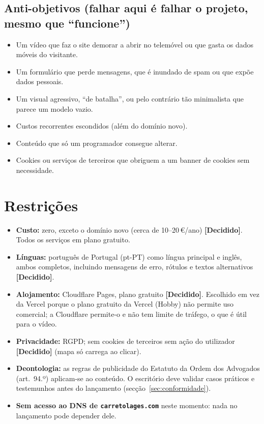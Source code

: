 \documentclass[11pt,a4paper]{article}
\newcommand{\decidido}{\textcolor{verde700}{\textbf{[Decidido]}}}
\begin{document}
\subsection{Anti-objetivos (falhar aqui é falhar o projeto, mesmo que ``funcione'')}
\begin{itemize}
  \item Um vídeo que faz o site demorar a abrir no telemóvel ou que gasta os dados móveis do visitante.
  \item Um formulário que perde mensagens, que é inundado de spam ou que expõe dados pessoais.
  \item Um visual agressivo, ``de batalha'', ou pelo contrário tão minimalista que parece um modelo vazio.
  \item Custos recorrentes escondidos (além do domínio novo).
  \item Conteúdo que só um programador consegue alterar.
  \item Cookies ou serviços de terceiros que obriguem a um banner de cookies sem necessidade.
\end{itemize}

\section{Restrições}
\begin{itemize}
  \item \textbf{Custo:} zero, exceto o domínio novo (cerca de 10--20\,€/ano) \decidido. Todos os serviços em plano gratuito.
  \item \textbf{Línguas:} português de Portugal (pt-PT) como língua principal e inglês, ambos completos, incluindo mensagens de erro, rótulos e textos alternativos \decidido.
  \item \textbf{Alojamento:} Cloudflare Pages, plano gratuito \decidido. Escolhido em vez da Vercel porque o plano gratuito da Vercel (Hobby) não permite uso comercial; a Cloudflare permite-o e não tem limite de tráfego, o que é útil para o vídeo.
  \item \textbf{Privacidade:} RGPD; sem cookies de terceiros sem ação do utilizador \decidido{} (mapa só carrega ao clicar).
  \item \textbf{Deontologia:} as regras de publicidade do Estatuto da Ordem dos Advogados (art.~94.º) aplicam-se ao conteúdo. O escritório deve validar casos práticos e testemunhos antes do lançamento (secção~\ref{sec:conformidade}).
  \item \textbf{Sem acesso ao DNS de \texttt{carretolages.com}} neste momento: nada no lançamento pode depender dele.
\end{itemize}
\end{document}
